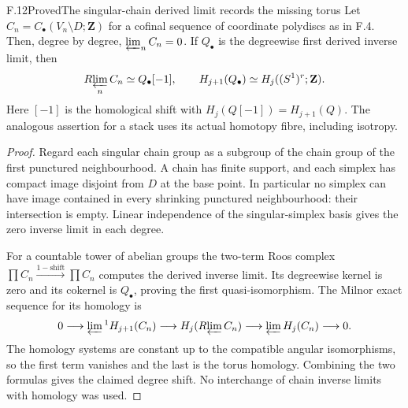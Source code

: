 \begin{statement}{F.12}{Proved}{The singular-chain derived limit records the missing torus}
Let $C_n=C_\bullet(V_n\setminus D;\mathbf Z)$ for a cofinal sequence
of coordinate polydiscs as in F.4. Then, degree by degree,
$\varprojlim_n C_n=0$. If $Q_\bullet$ is the degreewise first derived
inverse limit, then
\[
 R\!\varprojlim_n C_n\simeq Q_\bullet[-1],
 \qquad H_{j+1}(Q_\bullet)\simeq
       H_j((S^1)^r;\mathbf Z).
\]
Here $[-1]$ is the homological shift with
$H_j(Q[-1])=H_{j+1}(Q)$. The analogous assertion for a stack uses
its actual homotopy fibre, including isotropy.
\end{statement}
\begin{proof}
Regard each singular chain group as a subgroup of the chain group of
the first punctured neighbourhood. A chain has finite support, and
each simplex has compact image disjoint from $D$ at the base point.
In particular no simplex can have image contained in every shrinking
punctured neighbourhood: their intersection is empty. Linear
independence of the singular-simplex basis gives the zero inverse
limit in each degree.

For a countable tower of abelian groups the two-term Roos complex
$\prod C_n\xrightarrow{1-\mathrm{shift}}\prod C_n$ computes the
derived inverse limit. Its degreewise kernel is zero and its cokernel
is $Q_\bullet$, proving the first quasi-isomorphism. The Milnor exact
sequence for its homology is
\[
 0\longrightarrow\varprojlim{}^1 H_{j+1}(C_n)
 \longrightarrow H_j(R\!\varprojlim C_n)
 \longrightarrow\varprojlim H_j(C_n)\longrightarrow0.
\]
The homology systems are constant up to the compatible angular
isomorphisms, so the first term vanishes and the last is the torus
homology. Combining the two formulas gives the claimed degree shift.
No interchange of chain inverse limits with homology was used.
\end{proof}

